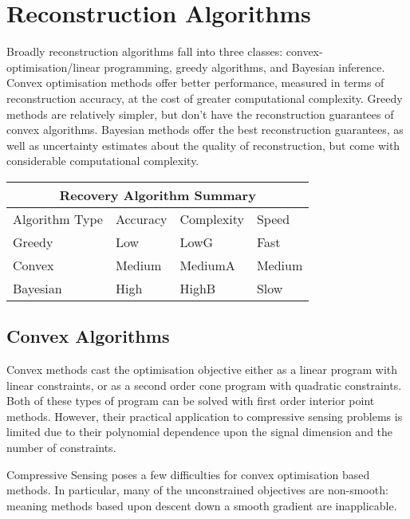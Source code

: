 
\section{Reconstruction Algorithms}
Broadly reconstruction algorithms fall into three classes: convex-optimisation/linear programming, greedy algorithms, and Bayesian inference. Convex optimisation methods offer better performance, measured in terms of reconstruction accuracy, at the cost of greater computational complexity. Greedy methods are relatively simpler, but don't have the reconstruction guarantees of convex algorithms. Bayesian methods offer the best reconstruction guarantees, as well as uncertainty estimates about the quality of reconstruction, but come with considerable computational complexity.

\begin{tabular}{ |p{3cm}||p{3cm}|p{3cm}|p{3cm}|  }
 \hline
 \multicolumn{4}{|c|}{Recovery Algorithm Summary} \\
 \hline
 Algorithm Type & Accuracy & Complexity & Speed\\
 \hline
 Greedy   & Low    &LowG&   Fast\\
 Convex&   Medium  & MediumA   &Medium\\
 Bayesian& High & HighB&  Slow\\
 \hline
\end{tabular}



\subsection{Convex Algorithms}
Convex methods cast the optimisation objective either as a linear program with linear constraints, or as a second order cone program with quadratic constraints. Both of these types of program can be solved with first order interior point methods. However, their practical application to compressive sensing problems is limited due to their polynomial dependence upon the signal dimension and the number of constraints. 

Compressive Sensing poses a few difficulties for convex optimisation based methods. In particular, many of the unconstrained objectives are non-smooth: meaning methods based upon descent down a smooth gradient are inapplicable. 

